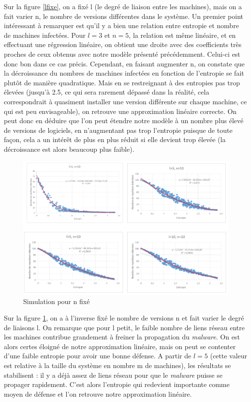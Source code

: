 Sur la figure \ref{lfixe}, on a fixé l (le degré de liaison entre les machines), mais on a fait varier n, le nombre de versions différentes dans le système. Un premier point intéressant à remarquer est qu'il y a bien une relation entre entropie et nombre de machines infectées. Pour $l=3$ et $n=5$, la relation est même linéaire, et en effectuant une régression linéaire, on obtient une droite avec des coefficients très proches de ceux obtenus avec notre modèle présenté précédemment. Celui-ci est donc bon dans ce cas précis.
Cependant, en faisant augmenter n, on constate que la décroissance du nombres de machines infectées en fonction de l'entropie se fait plutôt de manière quadratique. Mais en se restreignant à des entropies pas trop élevées (jusqu'à 2.5, ce qui sera rarement dépassé dans la réalité, cela correspondrait à quasiment installer une version différente sur chaque machine, ce qui est peu envisageable), on retrouve une approximation linéaire correcte. On peut donc en déduire que l'on peut étendre notre modèle à un nombre plus élevé de versions de logiciels, en n'augmentant pas trop l'entropie puisque de toute façon, cela a un intérêt de plus en plus réduit si elle devient trop élevée (la décroissance est alors beaucoup plus faible).

\begin{figure}[!ht]
\centering
     \includegraphics[width=1.0\linewidth]{Paul/python/nfixe.png}
     \caption{Simulation pour n fixé}
     \label{nfixe}
\end{figure}

Sur la figure \ref{nfixe}, on a à l'inverse fixé le nombre de versions n et fait varier le degré de liaisons l. On remarque que pour l petit, le faible nombre de liens réseau entre les machines contribue grandement à freiner la propagation du \textit{malware}. On est alors certes éloigné de notre approximation linéaire, mais on peut se contenter d'une faible entropie pour avoir une bonne défense. A partir de $l=5$ (cette valeur est relative à la taille du système en nombre m de machines), les résultats se stabilisent : il y a déjà assez de liens réseau pour que le \textit{malware} puisse se propager rapidement. C'est alors l'entropie qui redevient importante comme moyen de défense et l'on retrouve notre approximation linéaire.

